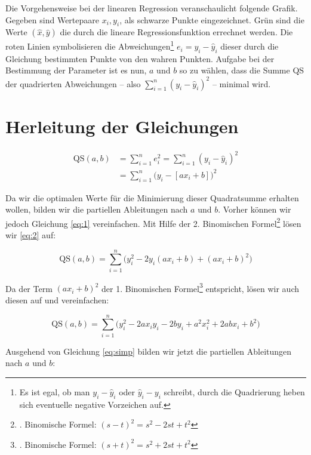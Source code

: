 \documentclass[ngerman, 12pt]{scrartcl}
\def\qs{\text{QS}(a,b)}
\def\sm{\sum\limits_{i=1}^{n}}
\begin{document}
Die Vorgehensweise bei der linearen Regression veranschaulicht folgende Grafik. Gegeben sind Wertepaare $x_i,y_i$, als schwarze Punkte eingezeichnet. Grün sind die Werte $(\hat{x},\hat{y})$ die durch die lineare Regressionsfunktion errechnet werden. Die roten Linien symbolisieren die Abweichungen\footnote{Es ist egal, ob man $y_i-\hat{y}_i$ oder $\hat{y}_i-y_i$ schreibt, durch die Quadrierung heben sich eventuelle negative Vorzeichen auf.}  $e_i=y_i-\hat{y}_i$ dieser durch die Gleichung bestimmten Punkte von den wahren Punkten. Aufgabe bei der Bestimmung der Parameter ist es nun, $a$ und $b$ so zu wählen, dass die Summe QS der quadrierten Abweichungen -- also $\sum_{i=1}^n (y_i-\hat{y}_i)^2$ -- minimal wird. 




\section{Herleitung der Gleichungen}


\begin{align}\label{eq:1}
\qs	&= \sum_{i=1}^{n} e_i^2 = \sm (y_i - \hat{y}_i)^2\\
								&= \sm \Big(y_i - [ax_i+b]\Big)^2 \label{eq:2}
\end{align}

Da wir die optimalen Werte für die Minimierung dieser Quadratsumme erhalten wollen, bilden wir die partiellen Ableitungen nach $a$ und $b$. Vorher können wir jedoch Gleichung \ref{eq:1} vereinfachen. Mit Hilfe der 2. Binomischen Formel\footnote{. Binomische Formel: \((s-t)^2 = s^2 -2st + t^2\)} lösen wir \ref{eq:2} auf:

\begin{equation}
	\qs = \sm \Big(y_i^2 - 2y_i (ax_i+b) + (ax_i +b)^2\Big)
\end{equation}

Da der Term \((ax_i +b)^2\) der 1. Binomischen Formel\footnote{. Binomische Formel: \((s+t)^2 = s^2 +2st + t^2\)} entspricht, lösen wir auch diesen auf und vereinfachen:

\begin{equation}
	\qs = \sm \Big(y_i^2 - 2ax_iy_i - 2by_i + a^2x_i^2 + 2abx_i + b^2\Big)\label{eq:simp}
\end{equation}

Ausgehend von Gleichung \ref{eq:simp} bilden wir jetzt die partiellen Ableitungen nach $a$ und $b$:
\end{document}
